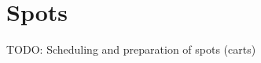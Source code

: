 \documentclass[../StudioOperationGuide.tex]{subfiles}
\begin{document}
\chapter{Spots}
TODO: Scheduling and preparation of spots (carts)
\end{document}
